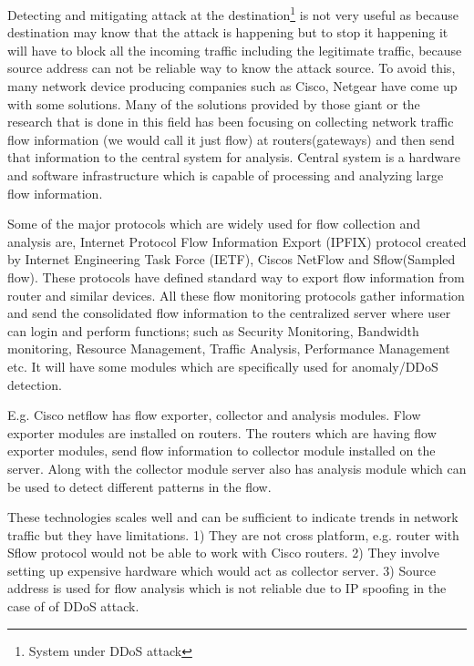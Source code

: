 \documentclass[10pt,oneside,a4paper]{article}
\begin{document}
Detecting and mitigating attack at the destination\footnote{System under DDoS attack} is not very useful as because destination may know that the attack is happening but to stop it happening it will have to block all the incoming traffic including the legitimate traffic, because source address can not be reliable way to know the attack source. To avoid this, many network device producing companies such as Cisco, Netgear have come up with some solutions. Many of the solutions provided by those giant or the research that is done in this field has been focusing on collecting network traffic flow information\cite{networkTrafficFlow} (we would call it just flow) at routers(gateways) and then send that information to the central system for analysis. Central system is a hardware and software infrastructure which is capable of processing and analyzing large flow information.\par

Some of the major protocols which are widely used for flow collection and analysis are, Internet Protocol Flow Information Export (IPFIX) protocol created by Internet Engineering Task Force (IETF), Ciscos NetFlow\cite{cisconetflow} and Sflow(Sampled flow)\cite{sflow}. These protocols have defined standard way to export flow information from router and similar devices. All these flow monitoring protocols gather information and send the consolidated flow information to the centralized server where user can login and perform functions; such as Security Monitoring, Bandwidth monitoring, Resource Management, Traffic Analysis, Performance Management etc. It will have some modules which are specifically used for anomaly/DDoS detection.\par

E.g. Cisco netflow has flow exporter, collector and analysis modules. Flow exporter modules are installed on routers. The routers which are having flow exporter modules, send flow information to collector module installed on the server. Along with the collector module server also has analysis module which can be used to detect different patterns in the flow.\par

These technologies scales well and can be sufficient to indicate trends in network traffic but they have limitations. 1) They are not cross platform, e.g. router with Sflow protocol would not be able to work with Cisco routers. 2) They involve setting up expensive hardware which would act as collector server. 3) Source address is used for flow analysis which is not reliable due to IP spoofing in the case of of DDoS attack.\par
\end{document}
